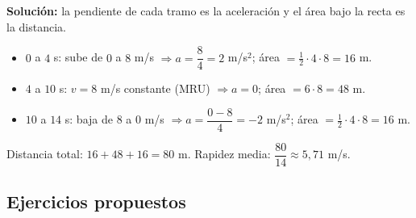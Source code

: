 \documentclass[12pt, letterpaper]{article}
\begin{document}
\begin{center}
\end{center}

\begin{cuadrosolucion}
  \textbf{Solución:} la pendiente de cada tramo es la aceleración y el área bajo la recta es la distancia.
  \begin{itemize}[leftmargin=*]
    \item $0$ a $4$ s: sube de $0$ a $8$ m/s $\Rightarrow a = \dfrac{8}{4} = 2$ m/s$^2$; área $= \tfrac{1}{2} \cdot 4 \cdot 8 = 16$ m.
    \item $4$ a $10$ s: $v = 8$ m/s constante (MRU) $\Rightarrow a = 0$; área $= 6 \cdot 8 = 48$ m.
    \item $10$ a $14$ s: baja de $8$ a $0$ m/s $\Rightarrow a = \dfrac{0 - 8}{4} = -2$ m/s$^2$; área $= \tfrac{1}{2} \cdot 4 \cdot 8 = 16$ m.
  \end{itemize}
  Distancia total: $16 + 48 + 16 = 80$ m. \quad Rapidez media: $\dfrac{80}{14} \approx 5{,}71$ m/s.
\end{cuadrosolucion}

\subsection{Ejercicios propuestos}
\end{document}

